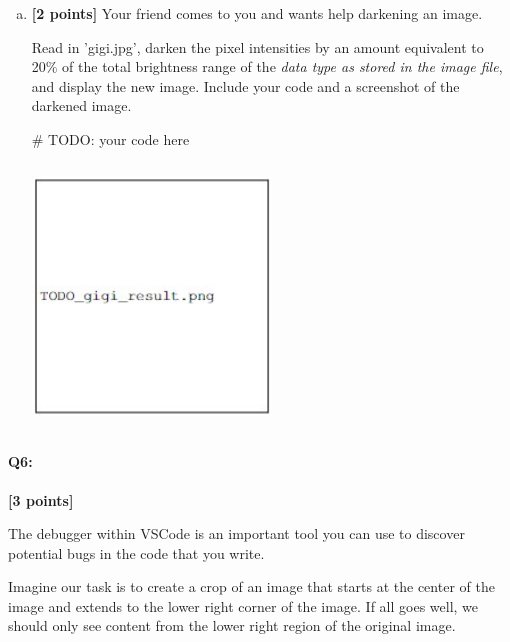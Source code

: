 \documentclass[11pt]{article}
\begin{document}
\begin{enumerate} [(a)]
\item \textbf{[2 points]} Your friend comes to you and wants help darkening an image.
\begin{tcolorbox}[colback=orange!5!white,colframe=orange!75!black]
Read in 'gigi.jpg', darken the pixel intensities by an amount equivalent to 20\% of the total brightness range of the \emph{data type as stored in the image file}, and display the new image. Include your code and a screenshot of the darkened image.
\end{tcolorbox}

\begin{tcolorbox}[colback=white!5!white,colframe=green!75!black,height fill]
    \begin{python}
    # TODO: your code here
    \end{python}
    
    \includegraphics[width=0.5\textwidth,height=7cm,keepaspectratio]{images/TODO_gigi_result.jpg}
\end{tcolorbox}
\end{enumerate}



\pagebreak
\paragraph{Q6:} \textbf{[3 points]}

The debugger within VSCode is an important tool you can use to discover potential bugs in the code that you write.

Imagine our task is to create a crop of an image that starts at the center of the image and extends to the lower right corner of the image. If all goes well, we should only see content from the lower right region of the original image.
\end{document}
